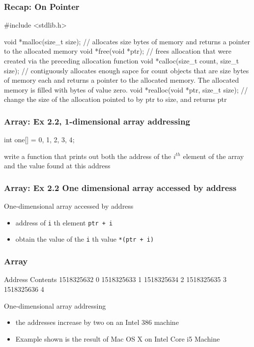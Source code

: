 \documentclass[newPxFont,sthlmFooter,nooffset]{beamer}
\begin{document}
\begin{frame}[t, fragile]
  \frametitle{Recap: On Pointer}
\begin{codedef}
#include <stdlib.h>

void *malloc(size_t size); // allocates size bytes of memory and returns a pointer to the allocated memory
void *free(void *ptr); // frees allocation that were created via the preceding allocation function
void *calloc(size_t count, size_t size); // contiguously allocates enough sapce for count objects that are size bytes of memory each and returns a pointer to the allocated memory. The allocated memory is filled with bytes of value zero.
void *realloc(void *ptr, size_t size); // change the size of the allocation pointed to by ptr to size, and returns ptr
\end{codedef}

\end{frame}




\begin{frame}[t, fragile]
  \frametitle{Array: Ex 2.2, 1-dimensional array addressing}
\begin{codedef}
int one[] = {0, 1, 2, 3, 4};   
\end{codedef}

write a function that prints out both the address of the $i^{th}$ element of the array and the value found at this address

\end{frame}

\begin{frame}[t, fragile]
  \frametitle{Array:  Ex 2.2 One dimensional array accessed by address}



One-dimensional array accessed by address
\begin{itemize}
\item address of \texttt{i} th element \texttt{ptr + i}
\item obtain the value of the \texttt{i} th value \texttt{*(ptr + i)}
\end{itemize}

\end{frame}

\begin{frame}[t, fragile]
  \frametitle{Array}
\begin{codedefnb}
Address		Contents
1518325632	    0
1518325633	    1
1518325634	    2
1518325635	    3
1518325636	    4
\end{codedefnb}
\bigskip
One-dimensional array addressing
\begin{itemize}
\item the addresses increase by two on an Intel 386 machine
\item Example shown is the result of Mac OS X on Intel Core i5 Machine
\end{itemize}

\end{frame}
\end{document}
